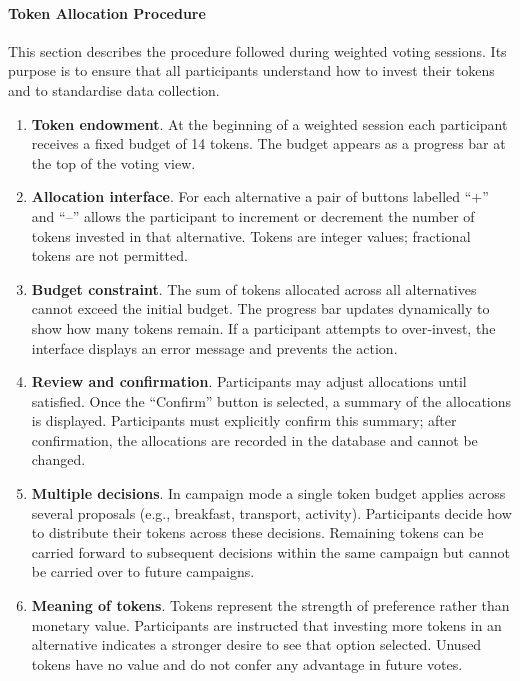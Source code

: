 \paragraph{Token Allocation Procedure}
\label{sec:token-allocation}

This section describes the procedure followed during weighted voting
sessions.  Its purpose is to ensure that all participants understand
how to invest their tokens and to standardise data collection.

\begin{enumerate}
    \item \textbf{Token endowment}.  At the beginning of a weighted
    session each participant receives a fixed budget of 14 tokens.  The
    budget appears as a progress bar at the top of the voting view.
    \item \textbf{Allocation interface}.  For each alternative a pair
    of buttons labelled “+” and “–” allows the participant to increment
    or decrement the number of tokens invested in that alternative.
    Tokens are integer values; fractional tokens are not permitted.
    \item \textbf{Budget constraint}.  The sum of tokens allocated across
    all alternatives cannot exceed the initial budget.  The progress bar
    updates dynamically to show how many tokens remain.  If a participant
    attempts to over‑invest, the interface displays an error message and
    prevents the action.
    \item \textbf{Review and confirmation}.  Participants may adjust
    allocations until satisfied.  Once the “Confirm” button is
    selected, a summary of the allocations is displayed.  Participants
    must explicitly confirm this summary; after confirmation, the
    allocations are recorded in the database and cannot be changed.
    \item \textbf{Multiple decisions}.  In campaign mode a single token
    budget applies across several proposals (e.g., breakfast, transport,
    activity).  Participants decide how to distribute their tokens
    across these decisions.  Remaining tokens can be carried forward to
    subsequent decisions within the same campaign but cannot be carried
    over to future campaigns.
    \item \textbf{Meaning of tokens}.  Tokens represent the strength of
    preference rather than monetary value.  Participants are instructed
    that investing more tokens in an alternative indicates a stronger
    desire to see that option selected.  Unused tokens have no value
    and do not confer any advantage in future votes.
\end{enumerate}

